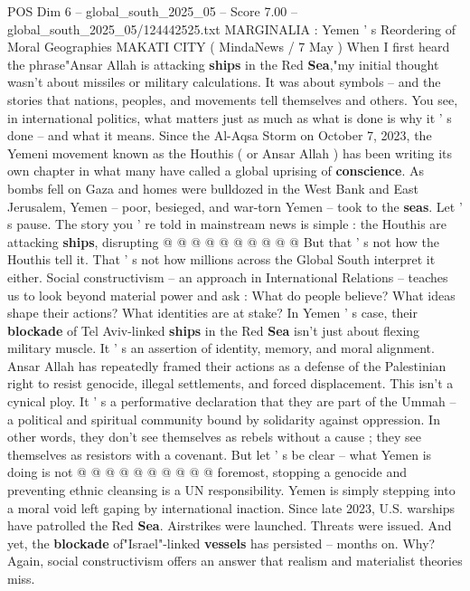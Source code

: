 \begin{textsample}{POS Dim 6 – global\_south\_2025\_05 – Score 7.00 – global\_south\_2025\_05/124442525.txt}  \label{ex:f6_pos_037}
MARGINALIA : Yemen ' s Reordering of Moral Geographies MAKATI CITY ( MindaNews / 7 May ) When I first heard the phrase"Ansar Allah is attacking \textbf{ships} in the Red \textbf{Sea},"my initial thought wasn't about missiles or military calculations.
It was about symbols -- and the stories that nations, peoples, and movements tell themselves and others.
You see, in international politics, what matters just as much as what is done is why it ' s done -- and what it means.
Since the Al-Aqsa Storm on October 7, 2023, the Yemeni movement known as the Houthis ( or Ansar Allah ) has been writing its own chapter in what many have called a global uprising of \textbf{conscience}.
As bombs fell on Gaza and homes were bulldozed in the West Bank and East Jerusalem, Yemen -- poor, besieged, and war-torn Yemen -- took to the \textbf{seas}.
Let ' s pause.
The story you ' re told in mainstream news is simple : the Houthis are attacking \textbf{ships}, disrupting @ @ @ @ @ @ @ @ @ @ But that ' s not how the Houthis tell it.
That ' s not how millions across the Global South interpret it either.
Social constructivism -- an approach in International Relations -- teaches us to look beyond material power and ask : What do people believe?
What ideas shape their actions?
What identities are at stake?
In Yemen ' s case, their \textbf{blockade} of Tel Aviv-linked \textbf{ships} in the Red \textbf{Sea} isn't just about flexing military muscle.
It ' s an assertion of identity, memory, and moral alignment.
Ansar Allah has repeatedly framed their actions as a defense of the Palestinian right to resist genocide, illegal settlements, and forced displacement.
This isn't a cynical ploy.
It ' s a performative declaration that they are part of the Ummah -- a political and spiritual community bound by solidarity against oppression.
In other words, they don't see themselves as rebels without a cause ; they see themselves as resistors with a covenant.
But let ' s be clear -- what Yemen is doing is not @ @ @ @ @ @ @ @ @ @ foremost, stopping a genocide and preventing ethnic cleansing is a UN responsibility.
Yemen is simply stepping into a moral void left gaping by international inaction.
Since late 2023, U.S. warships have patrolled the Red \textbf{Sea}.
Airstrikes were launched.
Threats were issued.
And yet, the \textbf{blockade} of"Israel"-linked \textbf{vessels} has persisted -- months on.
Why?
Again, social constructivism offers an answer that realism and materialist theories miss.

\end{textsample}
